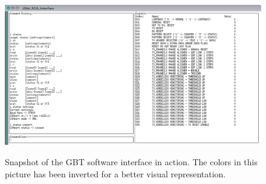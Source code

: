 \documentclass[main.tex]{subfiles}
\begin{document}
\begin{figure} %
\includegraphics[width=1.35\linewidth, trim={6mm 0 0 11mm},clip,angle=90]{../img/gbt_gui_inv.png}  \\[0.1 cm]
\caption{Snapshot of the GBT software interface in action. The colors in this picture has been inverted for a better visual representation.}
\label{fig:gbtgui}
\end{figure}


\end{document}
